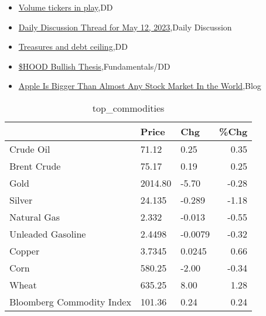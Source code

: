 \documentclass{article}%
\begin{document}
%
\begin{itemize}%
\item%
\href{https://reddit.com/r/wallstreetbets/comments/13fj800/volume\_tickers\_in\_play/}{Volume tickers in play},DD%
\item%
\href{https://reddit.com/r/wallstreetbets/comments/13fglm4/daily\_discussion\_thread\_for\_may\_12\_2023/}{Daily Discussion Thread for May 12, 2023},Daily Discussion%
\item%
\href{https://reddit.com/r/wallstreetbets/comments/13ffxha/treasures\_and\_debt\_ceiling/}{Treasures and debt ceiling},DD%
\item%
\href{https://reddit.com/r/StockMarket/comments/13f9ybs/hood\_bullish\_thesis/}{\$HOOD Bullish Thesis},Fundamentals/DD%
\item%
\href{https://reddit.com/r/Economics/comments/13f92zl/apple\_is\_bigger\_than\_almost\_any\_stock\_market\_in/}{Apple Is Bigger Than Almost Any Stock Market In the World},Blog%
\end{itemize}%


\begin{table}[htbp]%
\caption{top\_commodities}%
\centering%
\begin{adjustbox}{width=1\textwidth}%
\begin{tabular}{lllr}
\toprule
                          &   Price &     Chg &  \%Chg \\
\midrule
               Crude Oil  &   71.12 &    0.25 &  0.35 \\
             Brent Crude  &   75.17 &    0.19 &  0.25 \\
                    Gold  & 2014.80 &   -5.70 & -0.28 \\
                  Silver  &  24.135 &  -0.289 & -1.18 \\
             Natural Gas  &   2.332 &  -0.013 & -0.55 \\
       Unleaded Gasoline  &  2.4498 & -0.0079 & -0.32 \\
                  Copper  &  3.7345 &  0.0245 &  0.66 \\
                    Corn  &  580.25 &   -2.00 & -0.34 \\
                   Wheat  &  635.25 &    8.00 &  1.28 \\
Bloomberg Commodity Index &  101.36 &    0.24 &  0.24 \\
\bottomrule
\end{tabular}
%
\end{adjustbox}%
\end{table}
\end{document}
